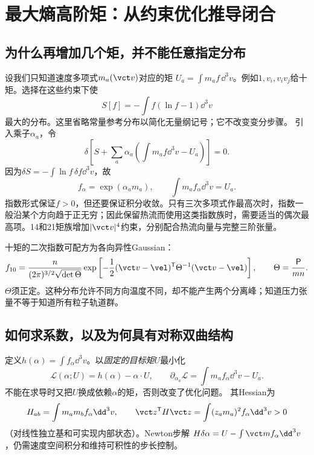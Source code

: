 \section{最大熵高阶矩：从约束优化推导闭合}
\subsection{为什么再增加几个矩，并不能任意指定分布}
设我们只知道速度多项式$m_a(\vct v)$对应的矩
$U_a=\int m_af\,\dd^3v$。例如$1,v_i,v_iv_j$给十矩。选择在这些约束下使
\begin{equation}
 S[f]=-\int f(\ln f-1)\dd^3v
\end{equation}
最大的分布。这里省略常量参考分布以简化无量纲记号；它不改变变分步骤。
引入乘子$\alpha_a$，令
\begin{equation}
 \delta\left[S+\sum_a\alpha_a\left(\int m_af\dd^3v-U_a\right)\right]=0.
\end{equation}
因为$\delta S=-\int\ln f\,\delta f\dd^3v$，故
\begin{equation}
 f_\alpha=\exp(\alpha_am_a),\qquad
 \int m_af_\alpha\dd^3v=U_a.
 \label{eq:selected-maxent}
\end{equation}
指数形式保证$f>0$，但还要保证积分收敛。只有三次多项式作最高次时，指数一般沿某个方向趋于正无穷；因此保留热流而使用这类指数族时，需要适当的偶次最高项。14和21矩族增加$|\vct v|^4$约束，分别配合热流向量与完整三阶张量。\citep{E553}

十矩的二次指数可配方为各向异性Gaussian：
\begin{equation}
 f_{10}={n\over(2\pi)^{3/2}\sqrt{\det\Theta}}
 \exp\left[-{1\over2}(\vct v-\vel)^{\mathsf T}\Theta^{-1}(\vct v-\vel)\right],
 \qquad\Theta={\mathsf P\over mn}.
\end{equation}
$\Theta$须正定。这种分布允许不同方向温度不同，却不能产生两个分离峰；知道压力张量不等于知道所有粒子轨道群。

\subsection{如何求系数，以及为何具有对称双曲结构}
定义$h(\alpha)=\int f_\alpha\dd^3v$。以\emph{固定的目标矩}$U$最小化
\begin{equation}
 \mathcal L(\alpha;U)=h(\alpha)-\alpha\cdot U,\qquad
 \partial_{\alpha_a}\mathcal L=\int m_af_\alpha\dd^3v-U_a.
\end{equation}
不能在求导时又把$U$换成依赖$\alpha$的矩，否则改变了优化问题。
其Hessian为
\begin{equation}
 H_{ab}=\int m_am_bf_\alpha\dd^3v,\qquad
 \vct z^{\mathsf T}H\vct z=\int(z_am_a)^2f_\alpha\dd^3v>0
\end{equation}
（对线性独立基和可实现内部状态）。Newton步解
$H\delta\alpha=U-\int\vct mf_\alpha\dd^3v$，仍需速度空间积分和维持可积性的步长控制。


